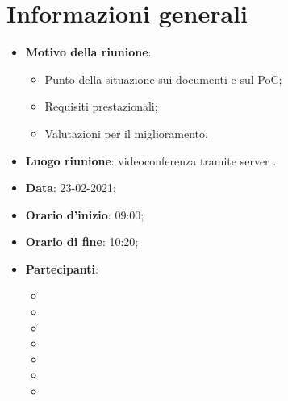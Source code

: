 \section{Informazioni generali}
\begin{itemize}
\item \textbf{Motivo della riunione}: 
\begin{itemize}
\item Punto della situazione sui documenti e sul PoC;
\item Requisiti prestazionali;
\item Valutazioni per il miglioramento.
\end{itemize}
\item \textbf{Luogo riunione}: videoconferenza tramite server .
\item \textbf{Data}: 23-02-2021;
\item \textbf{Orario d'inizio}: 09:00;
\item \textbf{Orario di fine}: 10:20;
\item \textbf{Partecipanti}:
	\begin{itemize}
	\item \BM{}
	\item \SG{}
	\item \SP{}
	\item \SH{}
	\item \PA{}
	\item \ZM{}
	\item \RA{}
	\end{itemize}
\end{itemize}

\newpage
